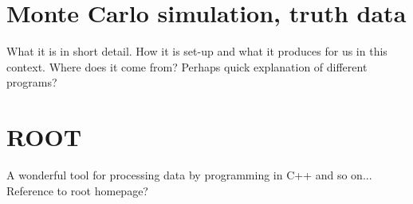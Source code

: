 \section{Monte Carlo simulation, truth data}
What it is in short detail. How it is set-up and what it produces for us in this context. 
Where does it come from? Perhaps quick explanation of different programs?
\section{ROOT}
A wonderful tool for processing data by programming in C++ and so on... Reference to root homepage?